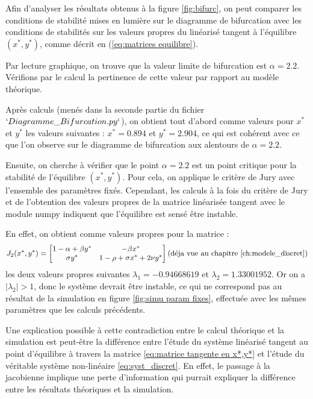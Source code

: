 Afin d'analyser les résultats obtenus à la figure \ref{fig:bifurc}, on peut comparer les conditions de stabilité mises en lumière sur le diagramme de bifurcation avec les conditions de stabilités sur les valeurs propres du linéarisé tangent à l'équilibre $(x^*, y^*)$, comme décrit en (\ref{eq:matrices equilibre}).

Par lecture graphique, on trouve que la valeur limite de bifurcation est $\alpha = 2.2$. Vérifions par le calcul la pertinence de cette valeur par rapport au modèle théorique.

Après calculs (menés dans la seconde partie du fichier $`Diagramme\_Bifurcation.py`$), on obtient tout d'abord comme valeurs pour $x^*$ et $y^*$ les valeurs suivantes : $x^* = 0.894$ et $y^* = 2.904$, ce qui est cohérent avec ce que l'on observe sur le diagramme de bifurcation aux alentours de $\alpha = 2.2$.

Ensuite, on cherche à vérifier que le point $\alpha = 2.2$ est un point critique pour la stabilité de l'équilibre $(x^*, y^*)$. Pour cela, on applique le critère de Jury avec l'ensemble des paramètres fixés. Cependant, les calculs à la fois du critère de Jury et de l'obtention des valeurs propres de la matrice linéarisée tangent avec le module numpy indiquent que l'équilibre est sensé être instable.

En effet, on obtient comme valeurs propres pour la matrice :
\begin{equation}
	\label{eq:matrice tangente en x*,y*}
	J_{2}(x^*, y^*) = 
  	\begin{bmatrix}
    	1 - \alpha + \beta y^* & - \beta x^* \\
    	\sigma y^* & 1 - \rho + \sigma x^* + 2 \nu y^*
  	\end{bmatrix}
	\text{(déja vue au chapitre \ref{ch:modele_discret})}
\end{equation}
les deux valeurs propres suivantes $\lambda_1 = -0.94668619$ et $\lambda_2 = 1.33001952$. Or on a $|\lambda_2| > 1$, donc le système devrait être instable, ce qui ne correspond pas au résultat de la simulation en figure \ref{fig:simu param fixes}, effectuée avec les mêmes paramètres que les calculs précédents.

Une explication possible à cette contradiction entre le calcul théorique et la simulation est peut-être la différence entre l'étude du système linéarisé tangent au point d'équilibre à travers la matrice \ref{eq:matrice tangente en x*,y*} et l'étude du véritable système non-linéaire \ref{eq:syst_discret}. En effet, le passage à la jacobienne implique une perte d'information qui purrait expliquer la différence entre les résultats théoriques et la simulation.



